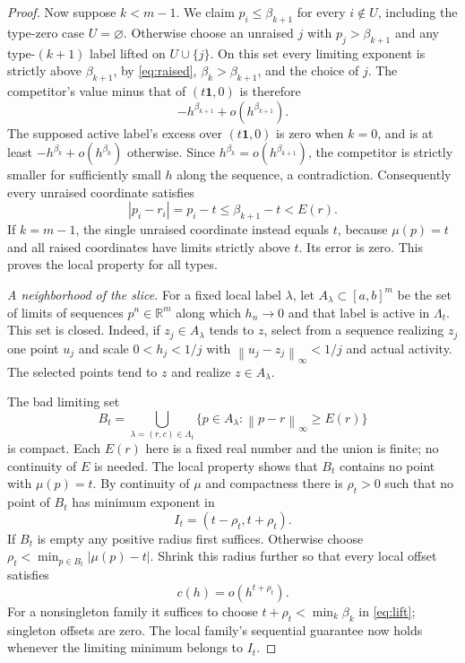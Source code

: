 \documentclass[11pt]{article}
\theoremstyle{definition}
\theoremstyle{remark}
\newcommand{\R}{\mathbb R}
\newcommand{\one}{\mathbf 1}
\newcommand{\norm}[1]{\left\|#1\right\|}
\numberwithin{equation}{section}
\begin{document}
\begin{proof}
Now suppose $k<m-1$. We claim $p_i\leq\beta_{k+1}$ for every
$i\notin U$, including the type-zero case $U=\varnothing$.
Otherwise choose an unraised $j$ with $p_j>\beta_{k+1}$ and any
type-$(k+1)$ label lifted on $U\cup\{j\}$. On this set every
limiting exponent is strictly above $\beta_{k+1}$, by
\eqref{eq:raised}, $\beta_k>\beta_{k+1}$, and the choice of $j$.
The competitor's value minus that of $(t\one,0)$ is therefore
\[
 -h^{\beta_{k+1}}+o(h^{\beta_{k+1}}).
\]
The supposed active label's excess over $(t\one,0)$ is zero
when $k=0$, and is at least $-h^{\beta_k}+o(h^{\beta_k})$
otherwise. Since $h^{\beta_k}=o(h^{\beta_{k+1}})$, the competitor
is strictly smaller for sufficiently small $h$ along the sequence,
a contradiction. Consequently every unraised coordinate satisfies
\[
 |p_i-r_i|=p_i-t\leq\beta_{k+1}-t<E(r).
\]
If $k=m-1$, the single unraised coordinate instead equals $t$,
because $\mu(p)=t$ and all raised coordinates have limits strictly
above $t$. Its error is zero. This proves the local property for
all types.

\medskip
\noindent\emph{A neighborhood of the slice.}
For a fixed local label $\lambda$, let $A_\lambda\subset[a,b]^m$
be the set of limits of sequences $p^n\in\R^m$ along which
$h_n\to0$ and that label is active in $\Lambda_t$. This set is
closed. Indeed, if $z_j\in A_\lambda$ tends to $z$, select from a
sequence realizing $z_j$ one point $u_j$ and scale $0<h_j<1/j$
with $\norm{u_j-z_j}_\infty<1/j$ and actual activity. The selected
points tend to $z$ and realize $z\in A_\lambda$.

The bad limiting set
\[
 B_t=\bigcup_{\lambda=(r,c)\in\Lambda_t}
      \{p\in A_\lambda:\norm{p-r}_\infty\geq E(r)\}
\]
is compact. Each $E(r)$ here is a fixed real number and the union
is finite; no continuity of $E$ is needed. The local property
shows that $B_t$ contains no point with $\mu(p)=t$. By continuity
of $\mu$ and compactness there is $\rho_t>0$ such that no point
of $B_t$ has minimum exponent in
\[
 I_t=(t-\rho_t,t+\rho_t).
\]
If $B_t$ is empty any positive radius first suffices. Otherwise
choose $\rho_t<\min_{p\in B_t}|\mu(p)-t|$.
Shrink this radius further so that every local offset satisfies
\begin{equation}
 c(h)=o(h^{t+\rho_t}).
 \label{eq:offsetdecay}
\end{equation}
For a nonsingleton family it suffices to choose
$t+\rho_t<\min_k\beta_k$ in \eqref{eq:lift}; singleton offsets
are zero. The local family's sequential guarantee now holds
whenever the limiting minimum belongs to $I_t$.


\end{proof}
\end{document}
